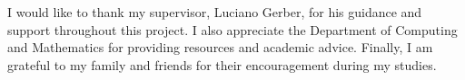 \begin{acknowledgements}
I would like to thank my supervisor, Luciano Gerber, for his guidance and support throughout this project. I also appreciate the Department of Computing and Mathematics for providing resources and academic advice. Finally, I am grateful to my family and friends for their encouragement during my studies.
\end{acknowledgements}